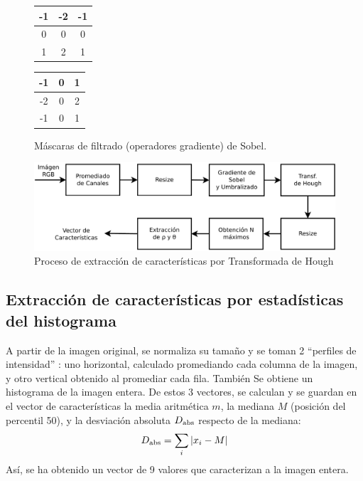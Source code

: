 \documentclass[conference,spanish,a4paper,10pt,oneside,final]{tfmpd}
\begin{document}
\begin{figure}
\begin{center}
\begin{tabular}{|c|c|c|}
\hline -1 & -2 & -1 \\\hline 0 & 0 & 0 \\\hline 1 & 2 & 1 \\\hline
\end{tabular}
\begin{tabular}{|c|c|c|}
\hline -1 & 0 & 1 \\\hline -2 & 0 & 2 \\\hline -1 & 0 & 1 \\\hline
\end{tabular}
\end{center}
\caption{Máscaras de filtrado (operadores gradiente) de Sobel.}
\label{masksobel}
\end{figure}
\begin{figure}
\begin{center}
\includegraphics[scale=0.25]{../diagramas/procesohough} 
\end{center}
\caption{Proceso de extracción de características %
por %
Transformada de Hough}
\label{procesohough}
\end{figure}
%
%
\subsection*{Extracción de características por estadísticas del histograma}
A partir de la imagen original, se normaliza su tamaño y se toman 2 ``perfiles
de intensidad'' : uno horizontal, calculado 
promediando cada columna de la
imagen, y otro vertical obtenido al promediar cada fila. También Se obtiene un
histograma de la imagen entera. De estos 3 vectores, se calculan
y se guardan en el
vector de características la media aritmética $m$, la mediana $M$ (posición del
percentil 50),  y la desviación absoluta $D_{\textrm{abs}}$ respecto de la mediana:
\begin{equation*}
D_{\textrm{abs}}=\sum_i |x_i - M|
\end{equation*}
Así, se ha obtenido un vector de 9 valores que caracterizan%
a la imagen entera.
\end{document}
